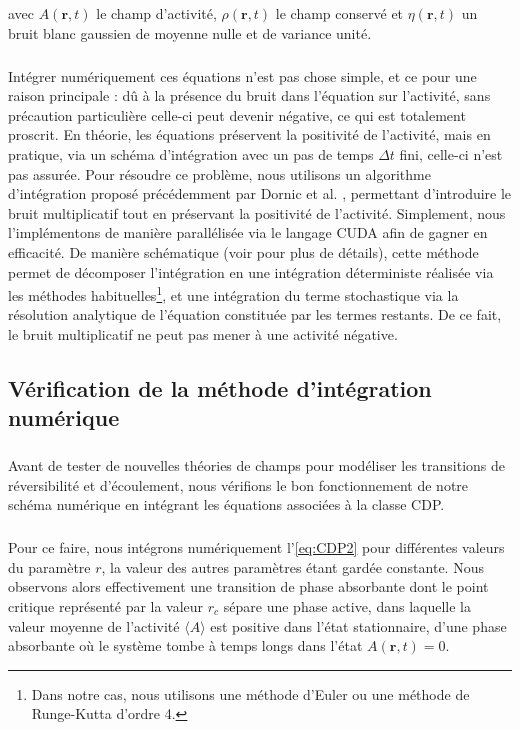 \noindent avec $A(\mathbf{r}, t)$ le champ d'activité, $\rho (\mathbf{r}, t)$ le champ conservé et $\eta (\mathbf{r}, t)$ un bruit blanc gaussien de moyenne nulle et de variance unité.

\subparagraph{}Intégrer numériquement ces équations n'est pas chose simple, et ce pour une raison principale : dû à la présence du bruit dans l'équation sur l'activité, sans précaution particulière celle-ci peut devenir négative, ce qui est totalement proscrit. En théorie, les équations préservent la positivité de l'activité, mais en pratique, via un schéma d'intégration avec un pas de temps $\Delta t$ fini, celle-ci n'est pas assurée. Pour résoudre ce problème, nous utilisons un algorithme d'intégration proposé précédemment par Dornic et al. \cite{dornic_integration_2005}, permettant d'introduire le bruit multiplicatif tout en préservant la positivité de l'activité. Simplement, nous l'implémentons de manière parallélisée via le langage CUDA afin de gagner en efficacité. De manière schématique (voir \cite{dornic_integration_2005} pour plus de détails), cette méthode permet de décomposer l'intégration en une intégration déterministe réalisée via les méthodes habituelles\footnote{Dans notre cas, nous utilisons une méthode d'Euler ou une méthode de Runge-Kutta d'ordre 4.}, et une intégration du terme stochastique via la résolution analytique de l'équation constituée par les termes restants. De ce fait, le bruit multiplicatif ne peut pas mener à une activité négative.

\subsection{Vérification de la méthode d'intégration numérique}

\subparagraph{}Avant de tester de nouvelles théories de champs pour modéliser les transitions de réversibilité et d'écoulement, nous vérifions le bon fonctionnement de notre schéma numérique en intégrant les équations associées à la classe CDP.

\subparagraph{}Pour ce faire, nous intégrons numériquement l'\autoref{eq:CDP2} pour différentes valeurs du paramètre $r$, la valeur des autres paramètres étant gardée constante. Nous observons alors effectivement une transition de phase absorbante dont le point critique représenté par la valeur $r_c$ sépare une phase active, dans laquelle la valeur moyenne de l'activité $\langle A \rangle$ est positive dans l'état stationnaire, d'une phase absorbante où le système tombe à temps longs dans l'état $A(\mathbf{r}, t) = 0$.

